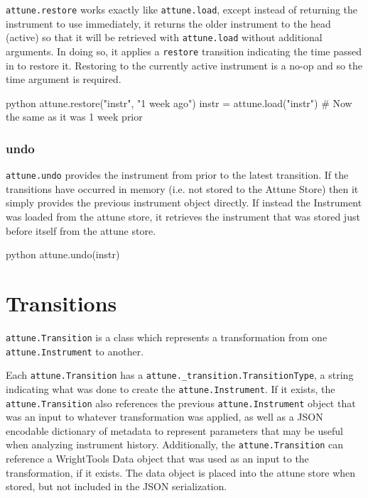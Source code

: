 \texttt{attune.restore} works exactly like \texttt{attune.load}, except
instead of returning the instrument to use immediately, it returns the
older instrument to the head (active) so that it will be retrieved with
\texttt{attune.load} without additional arguments. In doing so, it
applies a \texttt{restore} transition indicating the time passed in to
restore it. Restoring to the currently active instrument is a no-op and
so the time argument is required.

\begin{codefragment}{python}
attune.restore("instr", "1 week ago")
instr = attune.load("instr")  # Now the same as it was 1 week prior
\end{codefragment}

\hypertarget{undo}{%
\subsubsection{undo}\label{undo}}

\texttt{attune.undo} provides the instrument from prior to the latest
transition. If the transitions have occurred in memory (i.e. not stored
to the Attune Store) then it simply provides the previous instrument
object directly. If instead the Instrument was loaded from the attune
store, it retrieves the instrument that was stored just before itself
from the attune store.

\begin{codefragment}{python}
attune.undo(instr)
\end{codefragment}


\hypertarget{transitions}{%
\section{Transitions}\label{transitions}}

\texttt{attune.Transition} is a class which represents
a transformation from one \texttt{attune.Instrument} to
another.

Each \texttt{attune.Transition} has a
\texttt{attune.\_transition.TransitionType}, a string
indicating what was done to create the
\texttt{attune.Instrument}. If it exists, the
\texttt{attune.Transition} also references the previous
\texttt{attune.Instrument} object that was an input to
whatever transformation was applied, as well as a JSON encodable
dictionary of metadata to represent parameters that may be useful when
analyzing instrument history. Additionally, the
\texttt{attune.Transition} can reference a WrightTools
Data object that was used as an input to the transformation, if it
exists. The data object is placed into the attune store when stored, but
not included in the JSON serialization.

